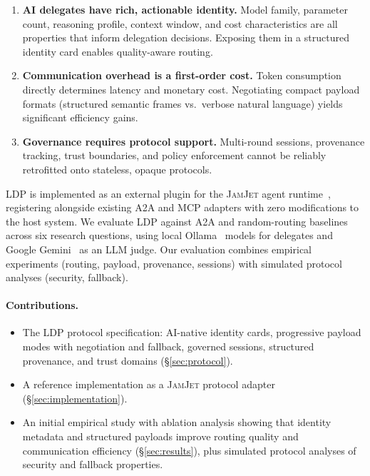 \documentclass[11pt,a4paper]{article}
\newcommand{\ldp}{\textsc{LDP}}
\newcommand{\atoa}{\textsc{A2A}}
\newcommand{\mcp}{\textsc{MCP}}
\newcommand{\jamjet}{\textsc{JamJet}}
\begin{document}
\begin{enumerate}[leftmargin=*]
\item \textbf{AI delegates have rich, actionable identity.} Model family, parameter count, reasoning profile, context window, and cost characteristics are all properties that inform delegation decisions. Exposing them in a structured identity card enables quality-aware routing.

\item \textbf{Communication overhead is a first-order cost.} Token consumption directly determines latency and monetary cost. Negotiating compact payload formats (structured semantic frames vs.\ verbose natural language) yields significant efficiency gains.

\item \textbf{Governance requires protocol support.} Multi-round sessions, provenance tracking, trust boundaries, and policy enforcement cannot be reliably retrofitted onto stateless, opaque protocols.
\end{enumerate}

\ldp{} is implemented as an external plugin for the \jamjet{} agent runtime~\citep{jamjet2024}, registering alongside existing \atoa{} and \mcp{} adapters with zero modifications to the host system.
We evaluate \ldp{} against \atoa{} and random-routing baselines across six research questions, using local Ollama~\citep{ollama2024} models for delegates and Google Gemini~\citep{google2024gemini} as an LLM judge. Our evaluation combines empirical experiments (routing, payload, provenance, sessions) with simulated protocol analyses (security, fallback).

\paragraph{Contributions.}
\begin{itemize}[leftmargin=*]
\item The \ldp{} protocol specification: AI-native identity cards, progressive payload modes with negotiation and fallback, governed sessions, structured provenance, and trust domains (\S\ref{sec:protocol}).
\item A reference implementation as a \jamjet{} protocol adapter (\S\ref{sec:implementation}).
\item An initial empirical study with ablation analysis showing that identity metadata and structured payloads improve routing quality and communication efficiency (\S\ref{sec:results}), plus simulated protocol analyses of security and fallback properties.
\end{itemize}
\end{document}
